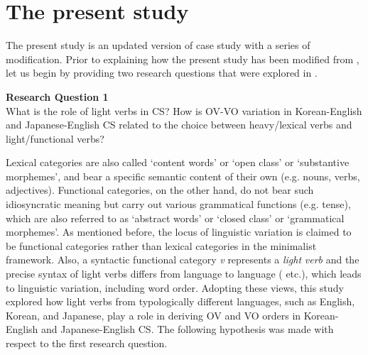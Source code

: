
\section{The present study}\label{ch1:sect:PresentStudy}

The present study is an updated version of  case study with a series of modification. Prior to explaining how the present study has been modified from \citet{Shim2011}, let us begin by providing two research questions that were explored in \citet{Shim2011}. 

\begin{exe}
\ex\label{ex:18}\textbf{ Research Question 1} \\
What is the role of light verbs in \ac{CS}? How is \ac{OV}-\ac{VO} variation in Korean-English and Japanese-English \ac{CS} related to the choice between heavy/lexical verbs and light/functional verbs? 
\end{exe}

Lexical categories are also called ‘content words’ or ‘open class’ or ‘substantive morphemes’, and bear a specific semantic content of their own (e.g. nouns, verbs, adjectives). Functional categories, on the other hand, do not bear such idiosyncratic meaning but carry out various grammatical functions (e.g. tense), which are also referred to as ‘abstract words’ or ‘closed class’ or ‘grammatical morphemes’. As mentioned before, the locus of linguistic variation is claimed to be functional categories rather than lexical categories in the minimalist framework. Also, a syntactic functional category \textit{v} represents a \textit{light} \textit{verb} and the precise syntax of light verbs differs from language to language (\citealt{Adger2003,Butt2003} etc.), which leads to linguistic variation, including word order. Adopting these views, this study explored how light verbs from typologically different languages, such as English, Korean, and Japanese, play a role in deriving \ac{OV} and  \ac{VO} orders in Korean-English and Japanese-English \ac{CS}. The following hypothesis was made with respect to the first research question.

